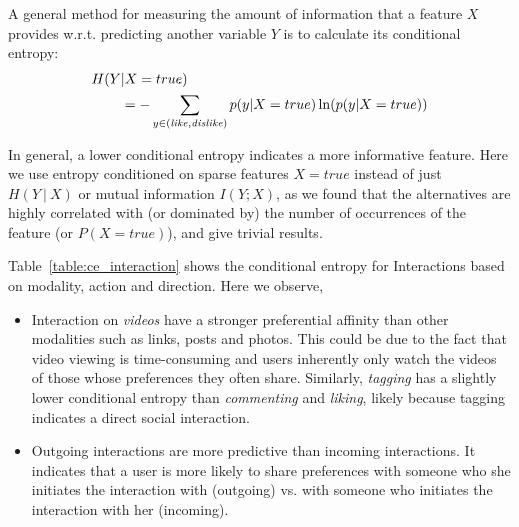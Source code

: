 A general method for measuring the amount of information that a 
feature $X$ provides w.r.t. predicting another variable $Y$ 
is to calculate its conditional entropy:
\begin{align*}
H(Y&|X=true)\\
& = -\sum_{y\in{(\like,\dislike)}} p(y|X=true) \ln( p(y|X=true))
\end{align*}

In general, a lower conditional entropy indicates a more informative
feature. Here we use entropy conditioned on sparse features $X=true$ 
instead of just $H(Y~|~X)$ or mutual information $I(Y; X)$, as we found 
that the alternatives are highly correlated with (or dominated by) the number of 
occurrences of the feature (or $P(X=true)$), and give trivial results. 

Table~\ref{table:ce_interaction} shows the conditional entropy for Interactions based on modality, action and direction. Here we observe,
\begin{itemize}
\item 
Interaction on {\em videos} have a stronger preferential affinity 
than other modalities such as links, posts and photos.  This could be
  due to the fact that video viewing is time-consuming and users
  inherently only watch the videos of those whose preferences they
  often share. Similarly, \textit{tagging} has a slightly lower conditional entropy than
  \textit{commenting} and \textit{liking}, likely because tagging indicates a direct
  social interaction. 
\item Outgoing interactions are more predictive than incoming interactions.
  It indicates that a user is more likely to share preferences with someone who she
  initiates the interaction with (outgoing) vs. with someone who
  initiates the interaction with her (incoming).  
\end{itemize}

